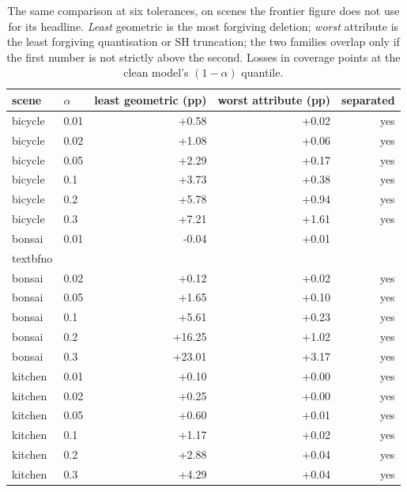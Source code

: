 \begin{table}[t]
\centering
\small
\setlength{\tabcolsep}{3.2pt}
\caption{The same comparison at six tolerances, on scenes the frontier figure does not use for its headline. \emph{Least} geometric is the most forgiving deletion; \emph{worst} attribute is the least forgiving quantisation or {SH} truncation; the two families overlap only if the first number is not strictly above the second. Losses in coverage points at the clean model's $(1-\alpha)$ quantile.}
\label{tab:j9}
\begin{tabular}{llrrr}
\toprule
scene & $\alpha$ & least geometric (pp) & worst attribute (pp) & separated \\
\midrule
bicycle & 0.01 & +0.58 & +0.02 & yes \\
bicycle & 0.02 & +1.08 & +0.06 & yes \\
bicycle & 0.05 & +2.29 & +0.17 & yes \\
bicycle & 0.1 & +3.73 & +0.38 & yes \\
bicycle & 0.2 & +5.78 & +0.94 & yes \\
bicycle & 0.3 & +7.21 & +1.61 & yes \\
bonsai & 0.01 & -0.04 & +0.01 & \\textbf{no} \\
bonsai & 0.02 & +0.12 & +0.02 & yes \\
bonsai & 0.05 & +1.65 & +0.10 & yes \\
bonsai & 0.1 & +5.61 & +0.23 & yes \\
bonsai & 0.2 & +16.25 & +1.02 & yes \\
bonsai & 0.3 & +23.01 & +3.17 & yes \\
kitchen & 0.01 & +0.10 & +0.00 & yes \\
kitchen & 0.02 & +0.25 & +0.00 & yes \\
kitchen & 0.05 & +0.60 & +0.01 & yes \\
kitchen & 0.1 & +1.17 & +0.02 & yes \\
kitchen & 0.2 & +2.88 & +0.04 & yes \\
kitchen & 0.3 & +4.29 & +0.04 & yes \\
\bottomrule
\end{tabular}
\end{table}
